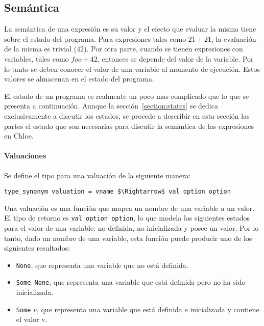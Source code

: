 \subsection{Semántica}\label{subsection:semantics_expressions}

La semántica de una expresión es su valor y el efecto que evaluar la misma tiene sobre el estado del programa.
Para expresiones tales como $21 + 21$, la evaluación de la misma es trivial ($42$).
Por otra parte, cuando se tienen expresiones con variables, tales como $foo + 42$, entonces se depende del valor de la variable.
Por lo tanto se deben conocer el valor de una variable al momento de ejecución.
Estos valores se almacenan en el estado del programa.

El estado de un programa es realmente un poco mas complicado que lo que se presenta a continuación.
Aunque la sección~\ref{section:states} se dedica exclusivamente a discutir los estados, se procede a describir en esta sección las partes el estado que son necesarias para discutir la semántica de las expresiones en Chloe.

\paragraph*{Valuaciones}\label{paragraph:valuation}

Se define el tipo para una valuación de la siguiente manera:

\begin{lstlisting}[frame=single, mathescape=true]
type_synonym valuation = vname $\Rightarrow$ val option option
\end{lstlisting}

Una valuación es una función que mapea un nombre de una variable a un valor.
El tipo de retorno es \verb|val option option|, lo que modela los siguientes estados para el valor de una variable: no definida, no inicializada y posee un valor.
Por lo tanto, dado un nombre de una variable, esta función puede producir uno de los siguientes resultados:

\begin{itemize}
  \item{\verb|None|, que representa una variable que no está definida.}
  \item{\verb|Some None|, que representa una variable que está definida pero no ha sido inicializada.}
  \item{\verb|Some| $v$, que representa una variable que está definida e inicializada y contiene el valor v.}
\end{itemize}

